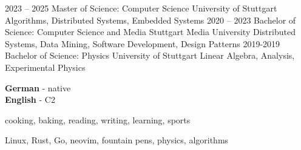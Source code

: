 \documentclass[9pt]{developercv} %
\begin{document}


\begin{entrylist}
	\entry
        {2023 -- 2025}
        {Master of Science: Computer Science}
        {University of Stuttgart}
        {Algorithms, Distributed Systems, Embedded Systems}
	\entry
        {2020 -- 2023}
        {Bachelor of Science: Computer Science and Media}
        {Stuttgart Media University}
        {Distributed Systems, Data Mining, Software Development, Design Patterns}
	\entry
        {2019-2019}
        {Bachelor of Science: Physics}
        {University of Stuttgart}
        {Linear Algebra, Analysis, Experimental Physics}
\end{entrylist}


\begin{minipage}[t]{0.265\textwidth}
	\vspace{-\baselineskip} %
	
	
	\textbf{German} - native\\
	\textbf{English} - C2\\
\end{minipage}
\hfill
\begin{minipage}[t]{0.3\textwidth}
	\vspace{-\baselineskip} %
	
	
	cooking, baking, reading, writing, learning, sports
\end{minipage}
\hfill
\begin{minipage}[t]{0.3\textwidth}
	\vspace{-\baselineskip} %
	
	
	Linux, Rust, Go, neovim, fountain pens, physics, algorithms
\end{minipage}

\end{document}
